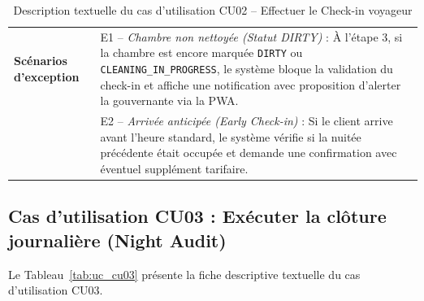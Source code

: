 \begin{table}[H]
\begin{tabularx}{\textwidth}{|p{3.5cm}|X|}
\hline
\textbf{Scénarios d'exception} & 
E1 -- \textit{Chambre non nettoyée (Statut DIRTY)} : À l'étape 3, si la chambre est encore marquée \texttt{DIRTY} ou \texttt{CLEANING\_IN\_PROGRESS}, le système bloque la validation du check-in et affiche une notification avec proposition d'alerter la gouvernante via la PWA.\\
& E2 -- \textit{Arrivée anticipée (Early Check-in)} : Si le client arrive avant l'heure standard, le système vérifie si la nuitée précédente était occupée et demande une confirmation avec éventuel supplément tarifaire.\\
\hline
\end{tabularx}
\caption{Description textuelle du cas d'utilisation CU02 -- Effectuer le Check-in voyageur}
\label{tab:uc_cu02}
\end{table}

\subsection{Cas d'utilisation CU03 : Exécuter la clôture journalière (Night Audit)}

Le Tableau~\ref{tab:uc_cu03} présente la fiche descriptive textuelle du cas d'utilisation CU03.

